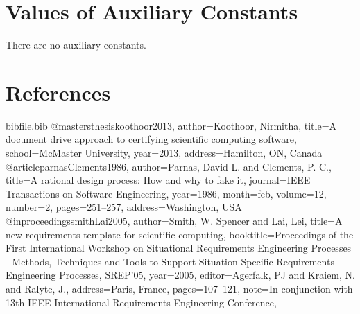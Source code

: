 \documentclass[12pt]{article}
\begin{document}
\section{Values of Auxiliary Constants}
\label{Sec:AuxConstants}
There are no auxiliary constants.

\section{References}
\label{Sec:References}
\begin{filecontents*}{bibfile.bib}
@mastersthesis{koothoor2013,
author={Koothoor, Nirmitha},
title={A document drive approach to certifying scientific computing software},
school={McMaster University},
year={2013},
address={Hamilton, ON, Canada}}
@article{parnasClements1986,
author={Parnas, David L. and Clements, P. C.},
title={A rational design process: How and why to fake it},
journal={IEEE Transactions on Software Engineering},
year={1986},
month=feb,
volume={12},
number={2},
pages={251--257},
address={Washington, USA}}
@inproceedings{smithLai2005,
author={Smith, W. Spencer and Lai, Lei},
title={A new requirements template for scientific computing},
booktitle={Proceedings of the First International Workshop on Situational Requirements Engineering Processes - Methods, Techniques and Tools to Support Situation-Specific Requirements Engineering Processes, SREP'05},
year={2005},
editor={Agerfalk, PJ and Kraiem, N. and Ralyte, J.},
address={Paris, France},
pages={107--121},
note={In conjunction with 13th IEEE International Requirements Engineering Conference,}}
\end{filecontents*}
\nocite{*}
\printbibliography[heading=none]
\end{document}
